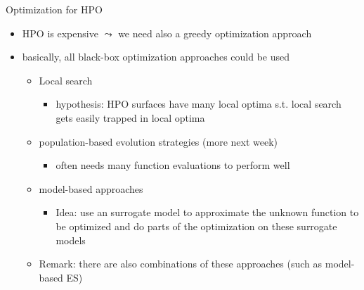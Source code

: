 \begin{frame}[c,fragile]{Optimization for HPO}

\begin{itemize}
	\item HPO is expensive $\leadsto$ we need also a greedy optimization approach
	\item basically, all black-box optimization approaches could be used
	\begin{itemize}
		\item Local search
		\begin{itemize}
			\item hypothesis: HPO surfaces have many local optima s.t. local search gets easily trapped in local optima
		\end{itemize}
	 	\medskip
		\item population-based evolution strategies (more next week)
		\begin{itemize}
			\item often needs many function evaluations to perform well
		\end{itemize}
		\medskip
		\item model-based approaches
		\begin{itemize}
			\item Idea: use an surrogate model to approximate the unknown function to be optimized and do parts of the optimization on these surrogate models
		\end{itemize}
	    \item Remark: there are also combinations of these approaches (such as model-based ES)
	\end{itemize}
\end{itemize}

\end{frame}
